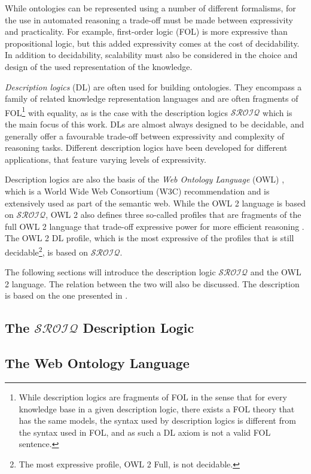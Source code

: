 
While ontologies can be represented using a number of different formalisms, for the use in automated reasoning a trade-off must be made between expressivity and practicality. For example, first-order logic (FOL) is more expressive than propositional logic, but this added expressivity comes at the cost of decidability. In addition to decidability, scalability must also be considered in the choice and design of the used representation of the knowledge.

\emph{Description logics} (DL) are often used for building ontologies. They encompass a family of related knowledge representation languages and are often fragments of FOL\footnote{While description logics are fragments of FOL in the sense that for every knowledge base in a given description logic, there exists a FOL theory that has the same models, the syntax used by description logics is different from the syntax used in FOL, and as such a DL axiom is not a valid FOL sentence.} with equality, as is the case with the description logics $\mathcal{SROIQ}$ which is the main focus of this work. DLs are almost always designed to be decidable, and generally offer a favourable trade-off between expressivity and complexity of reasoning tasks. Different description logics have been developed for different applications, that feature varying levels of expressivity.

Description logics are also the basis of the \emph{Web Ontology Language} (OWL) \cite{hitzler2009owl_primer,motik2009owl_spec}, which is a World Wide Web Consortium (W3C) recommendation and is extensively used as part of the semantic web. While the OWL 2 language is based on $\mathcal{SROIQ}$, OWL 2 also defines three so-called profiles that are fragments of the full OWL 2 language that trade-off expressive power for more efficient reasoning \cite{motik2009owl_profiles,motik2009owl_spec}. The OWL 2 DL profile, which is the most expressive of the profiles that is still decidable\footnote{The most expressive profile, OWL 2 Full, is not decidable.}, is based on $\mathcal{SROIQ}$.

The following sections will introduce the description logic $\mathcal{SROIQ}$ and the OWL 2 language. The relation between the two will also be discussed. The description is based on the one presented in \cite{rudolph2011foundations}.

\subsection{The \texorpdfstring{$\mathcal{SROIQ}$}{SROIQ} Description Logic} \label{sroiq-def}



\subsection{The Web Ontology Language} \label{owl-def}



